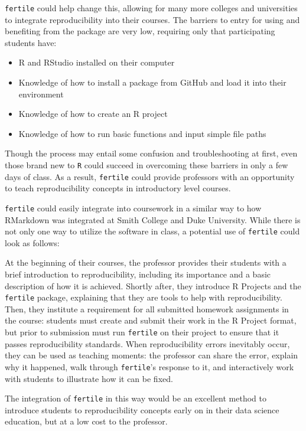\documentclass[12pt,twoside]{reedthesis}
\providecommand{\tightlist}{%
  \setlength{\itemsep}{0pt}\setlength{\parskip}{0pt}}
\begin{document}
\texttt{fertile} could help change this, allowing for many more colleges and universities to integrate reproducibility into their courses. The barriers to entry for using and benefiting from the package are very low, requiring only that participating students have:
\begin{itemize}
\tightlist
\item
  R and RStudio installed on their computer
\item
  Knowledge of how to install a package from GitHub and load it into their environment
\item
  Knowledge of how to create an R project
\item
  Knowledge of how to run basic functions and input simple file paths
\end{itemize}
Though the process may entail some confusion and troubleshooting at first, even those brand new to \texttt{R} could succeed in overcoming these barriers in only a few days of class. As a result, \texttt{fertile} could provide professors with an opportunity to teach reproducibility concepts in introductory level courses.

\texttt{fertile} could easily integrate into coursework in a similar way to how RMarkdown was integrated at Smith College and Duke University. While there is not only one way to utilize the software in class, a potential use of \texttt{fertile} could look as follows:

At the beginning of their courses, the professor provides their students with a brief introduction to reproducibility, including its importance and a basic description of how it is achieved. Shortly after, they introduce R Projects and the \texttt{fertile} package, explaining that they are tools to help with reproducibility. Then, they institute a requirement for all submitted homework assignments in the course: students must create and submit their work in the R Project format, but prior to submission must run \texttt{fertile} on their project to ensure that it passes reproducibility standards. When reproducibility errors inevitably occur, they can be used as teaching moments: the professor can share the error, explain why it happened, walk through \texttt{fertile}'s response to it, and interactively work with students to illustrate how it can be fixed.

The integration of \texttt{fertile} in this way would be an excellent method to introduce students to reproducibility concepts early on in their data science education, but at a low cost to the professor.
\end{document}

